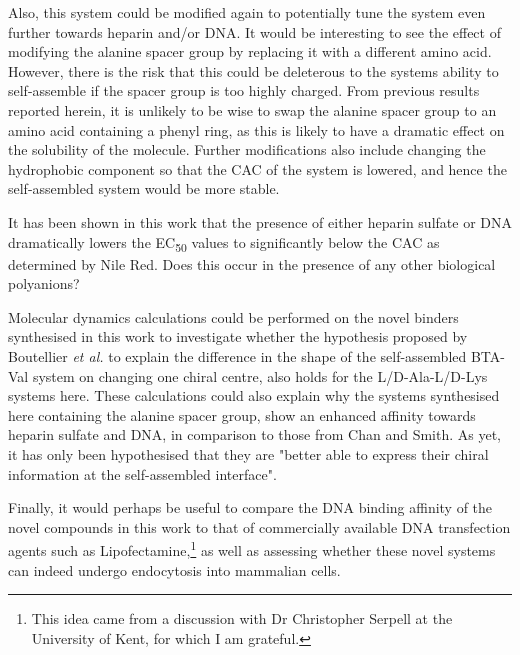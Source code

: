 Also, this system could be modified again to potentially tune the system even further towards heparin and/or DNA. It would be interesting to see the effect of modifying the alanine spacer group by replacing it with a different amino acid. However, there is the risk that this could be deleterous to the systems ability to self-assemble if the spacer group is too highly charged.\textsuperscript{\cite{Fechner2016ElectrostaticBinding}}  From previous results reported herein, it is unlikely to be wise to swap the alanine spacer group to an amino acid containing a phenyl ring, as this is likely to have a dramatic effect on the solubility of the molecule. Further modifications also include changing the hydrophobic component so that the CAC of the system is lowered, and hence the self-assembled system would be more stable. 

It has been shown in this work that the presence of either heparin sulfate or DNA dramatically lowers the EC\textsubscript{50} values to significantly below the CAC as determined by Nile Red. Does this occur in the presence of any other biological polyanions? 

Molecular dynamics calculations could be performed on the novel binders synthesised in this work to investigate whether the hypothesis proposed by Boutellier \textit{et al.}  to explain the difference in the shape of the self-assembled BTA-Val system on changing one chiral centre, also holds for the L/D-Ala-L/D-Lys systems here. 
These calculations could also explain why the systems synthesised here containing the alanine spacer group, show an enhanced affinity towards heparin sulfate and DNA, in comparison to those from Chan and Smith. As yet, it has only been hypothesised that they are "better able to express their chiral information at the self-assembled interface".\textsuperscript{\cite{Chan2016ChiralBinding}}

Finally, it would perhaps be useful to compare the DNA binding affinity of the novel compounds in this work to that of commercially available DNA transfection agents such as Lipofectamine,\footnote{This idea came from a discussion with Dr Christopher Serpell at the University of Kent, for which I am grateful.} as well as assessing whether these novel systems can indeed undergo endocytosis into mammalian cells. 
